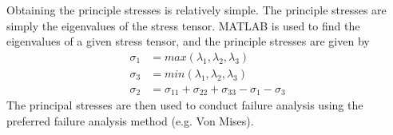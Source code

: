 \documentclass[../main.tex]{subfiles}
\begin{document}
Obtaining the principle stresses is relatively simple. The principle stresses are simply the eigenvalues of the stress tensor. MATLAB is used to find the eigenvalues of a given stress tensor, and the principle stresses are given by
	\begin{align}
	\sigma _1&=max(\lambda _1,\lambda _2,\lambda _3) \\
	\sigma _3&=min(\lambda _1,\lambda _2,\lambda _3) \\
	\sigma _2&=\sigma_{{11}}+\sigma_{{22}}+\sigma_{{33}}-\sigma_{{1}}-\sigma_{{3}}
	\end{align}
The principal stresses are then used to conduct failure analysis using the preferred failure analysis method (e.g. Von Mises).

	\pagebreak
\end{document}
